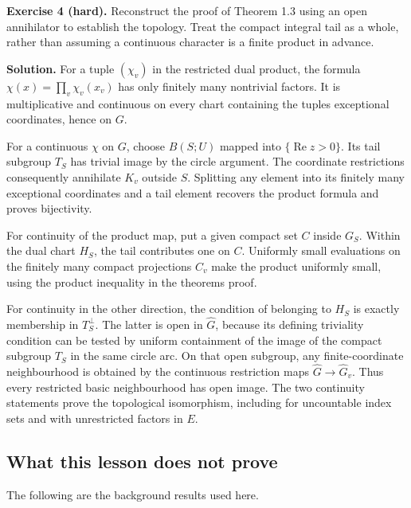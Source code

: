 \documentclass[
  english,
  11pt,
  a4paper,
]{article}
\begin{document}
\textbf{Exercise 4 (hard).} Reconstruct the proof of Theorem 1.3 using
an open annihilator to establish the topology. Treat the compact
integral tail as a whole, rather than assuming a continuous character is
a finite product in advance.

\textbf{Solution.} For a tuple \((\chi_v)\) in the restricted dual
product, the formula \(\chi(x)=\prod_v\chi_v(x_v)\) has only finitely
many nontrivial factors. It is multiplicative and continuous on every
chart containing the tuple\textquotesingle s exceptional coordinates,
hence on \(G\).

For a continuous \(\chi\) on \(G\), choose \(B(S;U)\) mapped into
\(\{\operatorname{Re}z>0\}\). Its tail subgroup \(T_S\) has trivial
image by the circle argument. The coordinate restrictions consequently
annihilate \(K_v\) outside \(S\). Splitting any element into its
finitely many exceptional coordinates and a tail element recovers the
product formula and proves bijectivity.

For continuity of the product map, put a given compact set \(C\) inside
\(G_S\). Within the dual chart \(H_S\), the tail contributes one on
\(C\). Uniformly small evaluations on the finitely many compact
projections \(C_v\) make the product uniformly small, using the product
inequality in the theorem\textquotesingle s proof.

For continuity in the other direction, the condition of belonging to
\(H_S\) is exactly membership in \(T_S^\perp\). The latter is open in
\(\widehat G\), because its defining triviality condition can be tested
by uniform containment of the image of the compact subgroup \(T_S\) in
the same circle arc. On that open subgroup, any finite-coordinate
neighbourhood is obtained by the continuous restriction maps
\(\widehat G\to\widehat G_v\). Thus every restricted basic neighbourhood
has open image. The two continuity statements prove the topological
isomorphism, including for uncountable index sets and with unrestricted
factors in \(E\).

\subsection{What this lesson does not
prove}\label{NT-ADL-01--what-this-lesson-does-not-prove}

The following are the background results used here.
\end{document}
